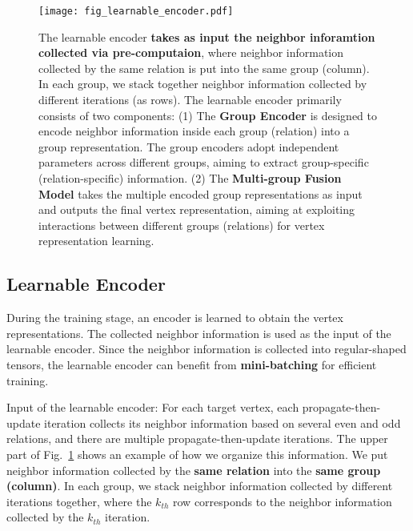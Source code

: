 \documentclass[lettersize,journal]{IEEEtran}
\begin{document}
\begin{figure}[!tp]
\centering\texttt{[image: fig\_learnable\_encoder.pdf]}
\vspace{-2mm}
\caption{
The learnable encoder \textbf{takes as input the neighbor inforamtion collected via pre-computaion}, where neighbor information collected by the same relation is put into the same group (column).
In each group, we stack together neighbor information collected by different iterations (as rows).
The learnable encoder primarily consists of two components: 
(1) The \textbf{Group Encoder} is designed to encode neighbor information inside each group (relation) into a group representation. 
The group encoders adopt independent parameters across different groups, aiming to extract group-specific (relation-specific) information. 
(2)  The \textbf{Multi-group Fusion Model} takes the multiple encoded group representations as input and outputs the final vertex representation, aiming at exploiting interactions between different groups (relations) for vertex representation learning.
}
 \label{fig:learnable_encoder}
 \vspace{-2mm}
\end{figure}


 
\subsection{Learnable Encoder}\label{sec:learnable_encoder}

During the training stage, an encoder is learned to obtain the vertex representations.
The collected neighbor information is used as the input of the learnable encoder.
Since the neighbor information is collected into regular-shaped tensors, the learnable encoder can benefit from \textbf{mini-batching} for efficient training.



Input of the learnable encoder:
For each target vertex, each propagate-then-update iteration collects its neighbor information based on several even and odd relations, and there are multiple propagate-then-update iterations.
The upper part of Fig.~\ref{fig:learnable_encoder} shows an example of how we organize this information.
We put neighbor information collected by the \textbf{same relation} into the \textbf{same group (column)}.
In each group, we stack neighbor information collected by different iterations together, where the $k_{th}$ row corresponds to the neighbor information collected by the $k_{th}$ iteration.
\end{document}
